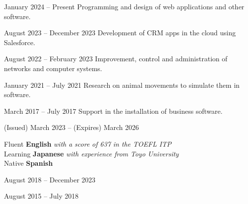\documentclass[a4paper,11pt]{memoir} %
\begin{document}
\userinformation %

\framebreak %


\heading{\fullname} %



\Sep


{January 2024 -- Present}
{Programming and design of web applications and other software.}

{August 2023 -- December 2023}
{Development of CRM apps in the cloud using Salesforce.}

{August 2022 -- February 2023}
{Improvement, control and administration of networks and computer systems.}

{January 2021 -- July 2021}
{Research on animal movements to simulate them in software.}

{March 2017 -- July 2017}
{Support in the installation of business software.}

\Sep


{(Issued) March 2023 -- (Expires) March 2026}{}

\Sep


\techtable

\Sep


\bluebullet Fluent \textbf{English} \textit{with a score of 637 in the TOEFL ITP} \\
\bluebullet Learning \textbf{Japanese} \textit{with experience from Toyo University} \\
\bluebullet Native \textbf{Spanish} \\



{August 2018 -- December 2023}{}

{August 2015 -- July 2018}{}

\end{document}
